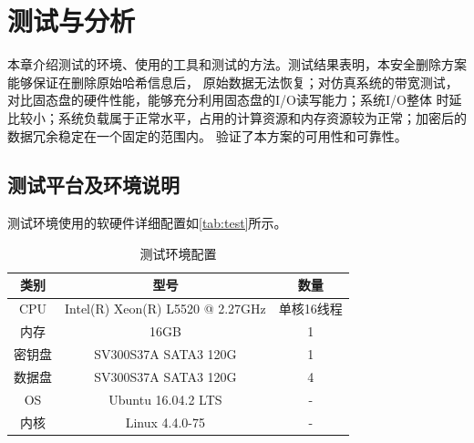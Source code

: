 \chapter{测试与分析}
本章介绍测试的环境、使用的工具和测试的方法。测试结果表明，本安全删除方案能够保证在删除原始哈希信息后，
原始数据无法恢复；对仿真系统的带宽测试，对比固态盘的硬件性能，能够充分利用固态盘的I/O读写能力；系统I/O整体
时延比较小；系统负载属于正常水平，占用的计算资源和内存资源较为正常；加密后的数据冗余稳定在一个固定的范围内。
验证了本方案的可用性和可靠性。
\section{测试平台及环境说明}
测试环境使用的软硬件详细配置如\autoref{tab:test}所示。
\begin{table}[H]
    \centering
    \caption{测试环境配置}
    \label{tab:test}
    \begin{tabular}{|c|c|c|}
        \hline
        类别 & 型号 & 数量 \\ \hline
        CPU & Intel(R) Xeon(R) L5520  @ 2.27GHz & 单核16线程 \\ \hline
        内存 & 16GB & 1 \\ \hline
        密钥盘 & SV300S37A SATA3 120G & 1 \\ \hline
        数据盘 & SV300S37A SATA3 120G & 4 \\ \hline
        OS & Ubuntu 16.04.2 LTS & - \\ \hline
        内核 & Linux 4.4.0-75 & - \\ \hline
    \end{tabular}
\end{table}
